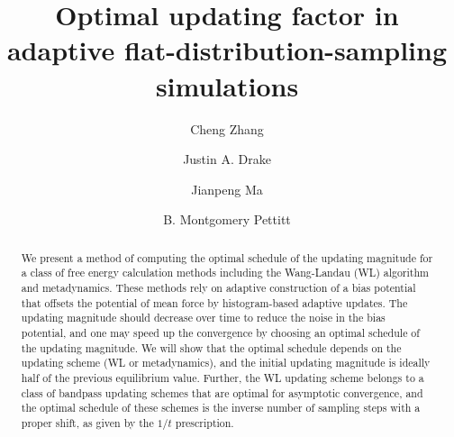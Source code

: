 \documentclass[reprint, superscriptaddress, floatfix]{revtex4-1}
\begin{document}
\title{Optimal updating factor in adaptive flat-distribution-sampling simulations}

\author{Cheng Zhang}
\author{Justin A. Drake}
\author{Jianpeng Ma}
\author{B. Montgomery Pettitt}



\begin{abstract}
  We present a method of computing the optimal schedule
  of the updating magnitude
  for a class of free energy calculation methods including
  the Wang-Landau (WL) algorithm and metadynamics.
  These methods rely on adaptive construction of
  a bias potential that offsets
  the potential of mean force by histogram-based adaptive updates.
  The updating magnitude should decrease over time
  to reduce the noise in the bias potential,
  and one may speed up the convergence by choosing an optimal schedule
  of the updating magnitude.
  We will show that
  the optimal schedule depends on the updating scheme (WL or metadynamics),
  and the initial updating magnitude is ideally half of
  the previous equilibrium value.
  Further,
  the WL updating scheme
  belongs to a class of bandpass updating schemes
  that are optimal for asymptotic convergence,
  and the optimal schedule of these schemes
  is the inverse number of sampling steps with a proper shift,
  as given by the $1/t$ prescription.
\end{abstract}

\maketitle
\end{document}
